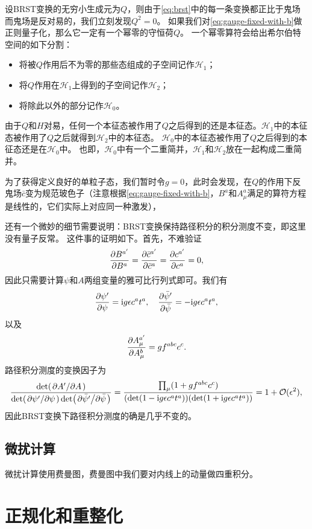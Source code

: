 设BRST变换的无穷小生成元为$Q$，则由于\eqref{eq:brst}中的每一条变换都正比于鬼场而鬼场是反对易的，我们立刻发现$Q^2=0$。
如果我们对\eqref{eq:gauge-fixed-with-b}做正则量子化，那么它一定有一个幂零的守恒荷$Q$。
一个幂零算符会给出希尔伯特空间的如下分割：
\begin{itemize}
    \item 将被$Q$作用后不为零的那些态组成的子空间记作$\mathcal{H}_1$；
    \item 将$Q$作用在$\mathcal{H}_1$上得到的子空间记作$\mathcal{H}_2$；
    \item 将除此以外的部分记作$\mathcal{H}_0$。
\end{itemize}
由于$Q$和$H$对易，任何一个本征态被作用了$Q$之后得到的还是本征态。$\mathcal{H}_1$中的本征态被作用了$Q$之后就得到$\mathcal{H}_2$中的本征态。
$\mathcal{H}_0$中的本征态被作用了$Q$之后得到的本征态还是在$\mathcal{H}_0$中。
也即，$\mathcal{H}_0$中有一个二重简并，$\mathcal{H}_1$和$\mathcal{H}_2$放在一起构成二重简并。

为了获得定义良好的单粒子态，我们暂时令$g=0$，此时会发现，在$Q$的作用下反鬼场$\bar{c}$变为规范玻色子（注意根据\eqref{eq:gauge-fixed-with-b}，$B^a$和$A^a_\mu$满足的算符方程是线性的，它们实际上对应同一种激发），

还有一个微妙的细节需要说明：BRST变换保持路径积分的积分测度不变，即这里没有量子反常。
这件事的证明如下。首先，不难验证
\[
    \pdv{B^{a'}}{B^a} = \pdv{\bar{c}^{a'}}{\bar{c}^{a}} = \pdv{c^{a'}}{c^a} = 0,
\]
因此只需要计算$\psi$和$A$两组变量的雅可比行列式即可。我们有
\[
    \pdv{\psi'}{\psi} = \mathrm{i} g \epsilon c^a t^a, \quad \pdv{\bar{\psi}'}{\bar{\psi}} = - \mathrm{i} g \epsilon c^a t^a,
\]
以及
\[
    \pdv{A^{a'}_\mu}{A^b_\mu} = g f^{abc} c^c.
\]
路径积分测度的变换因子为
\[
    \frac{\det (\pdv*{A'}{A})}{\det (\pdv*{\psi'}{\psi}) \det (\pdv*{\bar{\psi}'}{\bar{\psi}})} = \frac{\prod_\mu (1 + g f^{abc} c^c)}{(\det (1 - \mathrm{i} g \epsilon c^a t^a)) (\det (1 + \mathrm{i} g \epsilon c^a t^a))} = 1 + \mathcal{O}(\epsilon^2),
\]
因此BRST变换下路径积分测度的确是几乎不变的。

\subsection{微扰计算}

微扰计算使用费曼图，费曼图中我们要对内线上的动量做四重积分。

\section{正规化和重整化}

